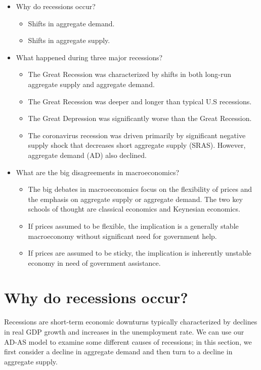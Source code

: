 \documentclass[11pt]{article} %
\begin{document}
\begin{tcolorbox}[width=\textwidth,colback={white},title={Big Questions},colbacktitle=yellow,coltitle=blue]
\begin{itemize}
\item Why do recessions occur?
\begin{itemize}
\item Shifts in aggregate demand.
\item Shifts in aggregate supply.
\end{itemize}
\item What happened during three major recessions?
\begin{itemize}
\item The Great Recession was characterized by shifts in both long-run aggregate supply and aggregate demand.
\item The Great Recession was deeper and longer than typical U.S recessions.
\item The Great Depression was significantly worse than the Great Recession.
\item The coronavirus recession was driven primarily by significant negative supply shock that decreases short aggregate supply (SRAS). However, aggregate demand (AD) also declined.
\end{itemize}
\item What are the big disagreements in macroeconomics?
\begin{itemize}
\item The big debates in macroeconomics focus on the flexibility of prices and the emphasis on aggregate supply or aggregate demand. The two key schools of thought are classical economics and Keynesian economics.
\item If prices assumed to be flexible, the implication is a generally stable macroeconomy without significant need for government help.
\item If prices are assumed to be sticky, the implication is inherently unstable economy in need of government assistance.
\end{itemize}
\end{itemize}
\end{tcolorbox}

\section*{Why do recessions occur?}
Recessions are short-term economic downturns typically characterized by declines in real GDP growth and increases in the unemployment rate. We can use our AD-AS model to examine some different causes of recessions; in this section, we first consider a decline in aggregate demand and then turn to a decline in aggregate supply.
\end{document}
